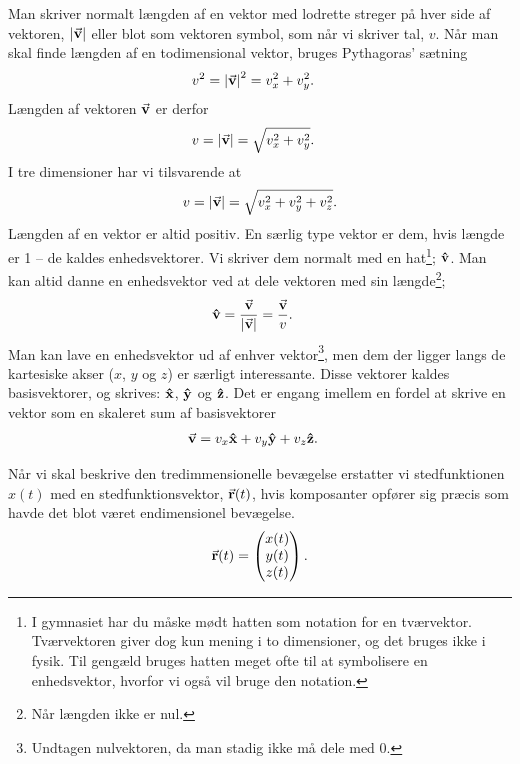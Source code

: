 Man skriver normalt længden af en vektor med lodrette streger på hver side af vektoren, $\abs{\va{v}}$ eller blot som vektoren symbol, som når vi skriver tal, $v$. 
Når man skal finde længden af en todimensional vektor, bruges Pythagoras' sætning
%
\begin{align}
    v^2 &= \abs{\va v}^2 = v_x^2+v_y^2. \label{pythagoras2}
\end{align}
%
Længden af vektoren $\va{v}$ er derfor
%
\begin{align}
    v &= \abs{\va{v}} = \sqrt{v_x^2+v_y^2}. \label{pythagoras2.5}
\end{align}
%
I tre dimensioner har vi tilsvarende at
%
\begin{align} \label{pythagoras3}
    v = \abs{\va v} = \sqrt{v_x^2+v_y^2+v_z^2}.
\end{align}
%
Længden af en vektor er altid positiv.
En særlig type vektor er dem, hvis længde er 1 -- de kaldes enhedsvektorer.
Vi skriver dem normalt med en hat\footnote{I gymnasiet har du måske mødt hatten som notation for en tværvektor. Tværvektoren giver dog kun mening i to dimensioner, og det bruges ikke i fysik. Til gengæld bruges hatten meget ofte til at symbolisere en enhedsvektor, hvorfor vi også vil bruge den notation.}; $\vu{v}$. Man kan altid danne en enhedsvektor ved at dele vektoren med sin længde\footnote{Når længden ikke er nul.};
%
\begin{align} \label{mat:eq:enhedsvektor}
    \vu{v} &= \frac{\va{v}}{\abs{\va{v}}} = \frac{\va{v}}{v}.
\end{align}
%
Man kan lave en enhedsvektor ud af enhver vektor\footnote{Undtagen nulvektoren, da man stadig ikke må dele med 0.}, men dem der ligger langs de kartesiske akser ($x$, $y$ og $z$) er særligt interessante. Disse vektorer kaldes basisvektorer, og skrives: $\vu{x}$, $\vu{y}$ og $\vu{z}$.
Det er engang imellem en fordel at skrive en vektor som en skaleret sum af basisvektorer
%
\begin{align}
    \va{v} &= v_x\vu{x} + v_y\vu{y} + v_z\vu{z}.
\end{align}

Når vi skal beskrive den tredimmensionelle bevægelse erstatter vi stedfunktionen $x(t)$ med en stedfunktionsvektor, $\va{r}(t)$, hvis komposanter opfører sig præcis som havde det blot været endimensionel bevægelse.
%
\begin{align}
    \va r(t)=\begin{pmatrix}
    x(t)\\y(t)\\z(t)
    \end{pmatrix}.
\end{align}

